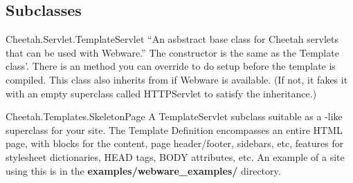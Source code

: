 \subsection{Subclasses}

\begin{description}

\item{Cheetah.Servlet.TemplateServlet}  ``An asbstract base class for Cheetah
     servlets that can be used with Webware.''  The constructor is the same
     as the Template class'.  There is an  method
     you can override to do setup before the template is compiled.  This class
     also inherits from  if Webware is
     available.  (If not, it fakes it with an empty superclass called
     HTTPServlet to satisfy the inheritance.)

\item{Cheetah.Templates.SkeletonPage}  A TemplateServlet subclass suitable as
     a -like superclass for your site.  The Template 
     Definition encompasses an entire HTML page, with blocks for the content,
     page header/footer, sidebars, etc, features for stylesheet dictionaries,
     HEAD tags, BODY attributes, etc.  An example of a site using this is in
     the {\bf examples/webware\_examples/} directory.

\end{description}
